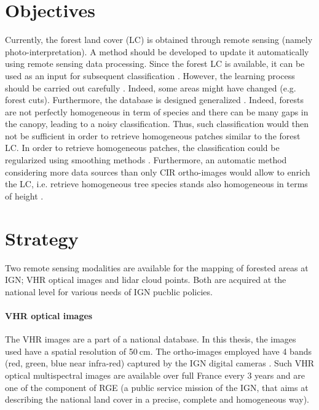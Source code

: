 \section{Objectives}
Currently, the forest land cover (LC) is obtained through remote sensing (namely photo-inter\-pretation). A method should be developed to update it automatically using remote sensing data processing. Since the forest LC is available, it can be used as an input for subsequent classification \citep{gressin2013updating}. However, the learning process should be carried out carefully \citep{gressin2014updating}. Indeed, some areas might have changed (e.g. forest cuts). Furthermore, the database is designed generalized \citep{smith1977database}. Indeed, forests are not perfectly homogeneous in term of species and there can be many gaps in the canopy, leading to a noisy classification. Thus, such classification would then not be sufficient in order to retrieve homogeneous patches similar to the forest LC. In order to retrieve homogeneous patches, the classification could be regularized using smoothing methods \citep{schindler2012overview}. Furthermore, an automatic method considering more data sources than only CIR ortho-images would allow to enrich the LC, i.e. retrieve homogeneous tree species stands also homogeneous in terms of height \citep{gressin2014unified}.

\section{Strategy}
Two remote sensing modalities are available for the mapping of forested areas at IGN; VHR optical images and lidar cloud points. Both are acquired at the national level for various needs of IGN pucblic policies.

\paragraph{VHR optical images \\}
The VHR images are a part of a national database. In this thesis, the images used have a spatial resolution of 50$\:$cm. The ortho-images employed have 4 bands (red, green, blue near infra-red) captured by the IGN digital cameras \citep{souchon2012large}. Such VHR optical multispectral images are available over full France every 3 years and are one of the component of RGE (a public service mission of the IGN, that aims at describing the national land cover in a precise, complete and homogeneous way).


